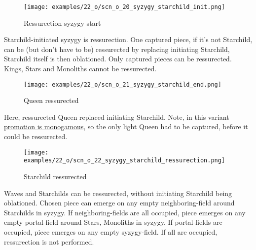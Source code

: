 \clearpage %

\vspace*{-2.1\baselineskip}
\noindent
\begin{figure}[!h]
\texttt{[image: examples/22\_o/scn\_o\_20\_syzygy\_starchild\_init.png]}
\caption{Ressurection syzygy start}
\label{fig:scn_o_20_syzygy_starchild_init}
\end{figure}

Starchild-initiated syzygy is ressurection. One captured piece, if it's not Starchild, can be (but
don't have to be) ressurected by replacing initiating Starchild, Starchild itself is then oblationed.
Only captured pieces can be ressurected. Kings, Stars and Monoliths cannot be ressurected.

\clearpage %

\vspace*{-2.1\baselineskip}
\noindent
\begin{figure}[!h]
\texttt{[image: examples/22\_o/scn\_o\_21\_syzygy\_starchild\_end.png]}
\caption{Queen ressurected}
\label{fig:scn_o_21_syzygy_starchild_end}
\end{figure}

Here, ressurected Queen replaced initiating Starchild. Note, in this variant
\hyperref[sec:One/Promotion]{promotion is monogamous}, so the only light Queen
had to be captured, before it could be ressurected.

\clearpage %

\vspace*{-2.1\baselineskip}
\noindent
\begin{figure}[!h]
\texttt{[image: examples/22\_o/scn\_o\_22\_syzygy\_starchild\_ressurection.png]}
\caption{Starchild ressurected}
\label{fig:scn_o_22_syzygy_starchild_ressurection}
\end{figure}

Waves and Starchilds can be ressurected, without initiating Starchild being oblationed. Chosen piece can emerge
on any empty neighboring-field around Starchilds in syzygy. If neighboring-fields are all occupied, piece emerges
on any empty portal-field around Stars, Monoliths in syzygy. If portal-fields are occupied, piece emerges on any
empty syzygy-field. If all are occupied, ressurection is not performed.

